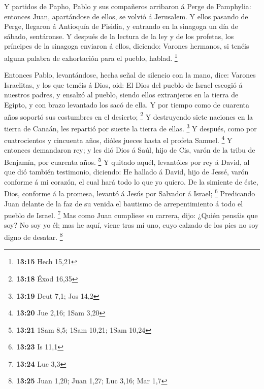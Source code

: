  Y partidos de Papho, Pablo y sus compañeros arribaron á
Perge de Pamphylia: entonces Juan, apartándose de ellos, se volvió á
Jerusalem.  Y ellos pasando de Perge, llegaron á
Antioquía de Pisidia, y entrando en la sinagoga un día de sábado,
sentáronse.  Y después de la lectura de la ley y de los
profetas, los príncipes de la sinagoga enviaron á ellos, diciendo:
Varones hermanos, si tenéis alguna palabra de exhortación para el
pueblo, hablad. \footnote{\textbf{13:15} Hech 15,21}

 Entonces Pablo, levantándose, hecha señal de silencio
con la mano, dice: Varones Israelitas, y los que teméis á Dios, oid:
 El Dios del pueblo de Israel escogió á nuestros padres,
y ensalzó al pueblo, siendo ellos extranjeros en la tierra de Egipto, y
con brazo levantado los sacó de ella.  Y por tiempo como
de cuarenta años soportó sus costumbres en el desierto; \footnote{\textbf{13:18}
  Éxod 16,35}  Y destruyendo siete naciones en la tierra
de Canaán, les repartió por suerte la tierra de ellas. \footnote{\textbf{13:19}
  Deut 7,1; Jos 14,2}  Y después, como por cuatrocientos
y cincuenta años, dióles jueces hasta el profeta Samuel. \footnote{\textbf{13:20}
  Jue 2,16; 1Sam 3,20}  Y entonces demandaron rey; y les
dió Dios á Saúl, hijo de Cis, varón de la tribu de Benjamín, por
cuarenta años. \footnote{\textbf{13:21} 1Sam 8,5; 1Sam 10,21; 1Sam 10,24}
 Y quitado aquél, levantóles por rey á David, al que dió
también testimonio, diciendo: He hallado á David, hijo de Jessé, varón
conforme á mi corazón, el cual hará todo lo que yo quiero.
 De la simiente de éste, Dios, conforme á la promesa,
levantó á Jesús por Salvador á Israel; \footnote{\textbf{13:23} Is 11,1}
 Predicando Juan delante de la faz de su venida el
bautismo de arrepentimiento á todo el pueblo de Israel. \footnote{\textbf{13:24}
  Luc 3,3}  Mas como Juan cumpliese su carrera, dijo:
¿Quién pensáis que soy? No soy yo él; mas he aquí, viene tras mí uno,
cuyo calzado de los pies no soy digno de desatar. \footnote{\textbf{13:25}
  Juan 1,20; Juan 1,27; Luc 3,16; Mar 1,7}

